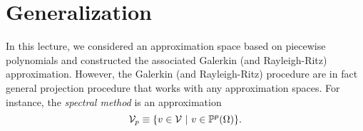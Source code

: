 \section{Generalization}
In this lecture, we considered an approximation space based on piecewise polynomials and constructed the associated Galerkin (and Rayleigh-Ritz) approximation. However, the Galerkin (and Rayleigh-Ritz) procedure are in fact general projection procedure that works with any approximation spaces. For instance, the \emph{spectral method} is an approximation 
\begin{equation*}
  \mathcal{V}_p \equiv \{ v \in \mathcal{V} \ | \ v \in \mathbb{P}^p(\Omega) \}.
\end{equation*}
